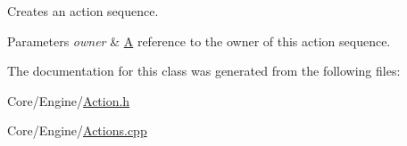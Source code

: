 Creates an action sequence. 


\begin{DoxyParams}{Parameters}
{\em owner} & \hyperlink{classA}{A} reference to the owner of this action sequence. \\
\hline
\end{DoxyParams}


The documentation for this class was generated from the following files\-:\begin{DoxyCompactItemize}
\item 
Core/\-Engine/\hyperlink{Action_8h}{Action.\-h}\item 
Core/\-Engine/\hyperlink{Actions_8cpp}{Actions.\-cpp}\end{DoxyCompactItemize}
